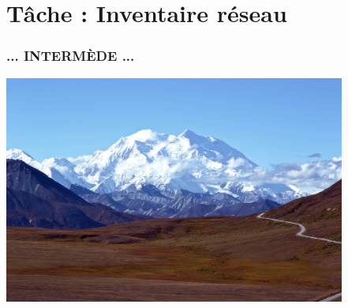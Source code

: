 \documentclass{beamer}
\begin{document}
\section{Tâche : Inventaire réseau}
%
%

\begin{frame}
    \frametitle{... INTERM\`{E}DE ...}

         \includegraphics[height=7.5cm]{./pics/montagne.jpg}

\end{frame}
\end{document}
